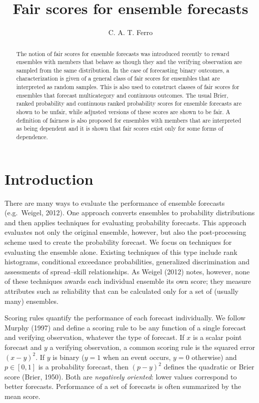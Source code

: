 \documentclass{article}
\begin{document}
\title{Fair scores for ensemble forecasts}
\author{C. A. T. Ferro}
\date{}
\maketitle

\begin{abstract}
The notion of fair scores for ensemble forecasts was introduced recently to
reward ensembles with members that behave as though they and the verifying
observation are sampled from the same distribution. In the case of forecasting
binary outcomes, a characterization is given of a general class of fair scores
for ensembles that are interpreted as random samples. This is also used to
construct classes of fair scores for ensembles that forecast multicategory and
continuous outcomes. The usual Brier, ranked probability and continuous ranked
probability scores for ensemble forecasts are shown to be unfair, while adjusted
versions of these scores are shown to be fair. A definition of fairness is also
proposed for ensembles with members that are interpreted as being dependent and
it is shown that fair scores exist only for some forms of dependence.
\end{abstract}

\section{Introduction}
There are many ways to evaluate the performance of ensemble forecasts (e.g.\
Weigel, 2012). One approach converts ensembles to probability distributions and
then applies techniques for evaluating probability forecasts. This approach
evaluates not only the original ensemble, however, but also the
post-processing scheme used to create the probability forecast. We focus on
techniques for evaluating the ensemble alone. Existing techniques of this type
include rank histograms, conditional exceedance probabilities, generalized
discrimination and assessments of spread--skill relationships. As Weigel (2012)
notes, however, none of these techniques awards each individual ensemble its
own score; they measure attributes such as reliability that can be calculated
only for a set of (usually many) ensembles.

Scoring rules quantify the performance of each forecast individually. We follow
Murphy (1997) and define a scoring rule to be any function of a single forecast
and verifying observation, whatever the type of forecast. If $x$ is a scalar
point forecast and $y$ a verifying observation, a common scoring rule is the
squared error $(x-y)^2$. If $y$ is binary ($y=1$ when an event occurs, $y=0$
otherwise) and $p\in[0,1]$ is a probability forecast, then $(p-y)^2$ defines
the quadratic or Brier score (Brier, 1950). Both are \emph{negatively oriented}:
lower values correspond to better forecasts. Performance of a set of forecasts
is often summarized by the mean score.
\end{document}

